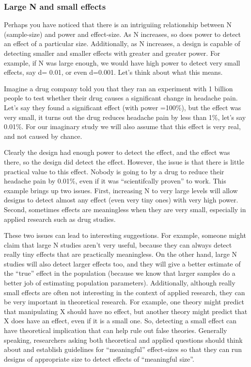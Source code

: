\documentclass[
  letterpaper,
  DIV=11,
  numbers=noendperiod]{scrartcl}
\begin{document}
\hypertarget{large-n-and-small-effects}{%
\subsubsection{Large N and small
effects}\label{large-n-and-small-effects}}

Perhaps you have noticed that there is an intriguiing relationship
between N (sample-size) and power and effect-size. As N increases, so
does power to detect an effect of a particular size. Additionally, as N
increases, a design is capable of detecting smaller and smaller effects
with greater and greater power. For example, if N was large enough, we
would have high power to detect very small effects, say d= 0.01, or even
d=0.001. Let's think about what this means.

Imagine a drug company told you that they ran an experiment with 1
billion people to test whether their drug causes a significant change in
headache pain. Let's say they found a significant effect (with power
=100\%), but the effect was very small, it turns out the drug reduces
headache pain by less than 1\%, let's say 0.01\%. For our imaginary
study we will also assume that this effect is very real, and not caused
by chance.

Clearly the design had enough power to detect the effect, and the effect
was there, so the design did detect the effect. However, the issue is
that there is little practical value to this effect. Nobody is going to
by a drug to reduce their headache pain by 0.01\%, even if it was
``scientifcally proven'' to work. This example brings up two issues.
First, increasing N to very large levels will allow designs to detect
almost any effect (even very tiny ones) with very high power. Second,
sometimes effects are meaningless when they are very small, especially
in applied research such as drug studies.

These two issues can lead to interesting suggestions. For example,
someone might claim that large N studies aren't very useful, because
they can always detect really tiny effects that are practically
meaningless. On the other hand, large N studies will also detect larger
effects too, and they will give a better estimate of the ``true'' effect
in the population (because we know that larger samples do a better job
of estimating population parameters). Additionally, although really
small effects are often not interesting in the context of applied
research, they can be very important in theoretical research. For
example, one theory might predict that manipulating X should have no
effect, but another theory might predict that X does have an effect,
even if it is a small one. So, detecting a small effect can have
theoretical implication that can help rule out false theories. Generally
speaking, researchers asking both theoretical and applied questions
should think about and establish guidelines for ``meaningful''
effect-sizes so that they can run designs of appropriate size to detect
effects of ``meaningful size''.
\end{document}
